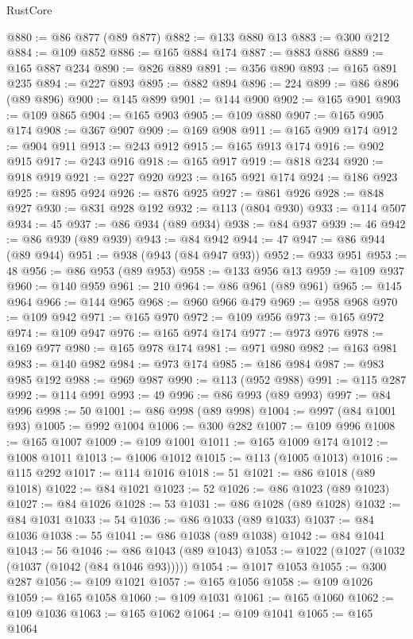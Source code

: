 \begin{lexlean}{RustCore}
\begin{coremodule}
@880 := @86 @877 (@89 @877)
@882 := @133 @880 @13
@883 := @300 @212
@884 := @109 @852
@886 := @165 @884 @174
@887 := @883 @886
@889 := @165 @887 @234
@890 := @826 @889
@891 := @356 @890
@893 := @165 @891 @235
@894 := @227 @893
@895 := @882 @894
@896 := 224
@899 := @86 @896 (@89 @896)
@900 := @145 @899
@901 := @144 @900
@902 := @165 @901
@903 := @109 @865
@904 := @165 @903
@905 := @109 @880
@907 := @165 @905 @174
@908 := @367 @907
@909 := @169 @908
@911 := @165 @909 @174
@912 := @904 @911
@913 := @243 @912
@915 := @165 @913 @174
@916 := @902 @915
@917 := @243 @916
@918 := @165 @917
@919 := @818 @234
@920 := @918 @919
@921 := @227 @920
@923 := @165 @921 @174
@924 := @186 @923
@925 := @895 @924
@926 := @876 @925
@927 := @861 @926
@928 := @848 @927
@930 := @831 @928 @192
@932 := @113 (@804 @930)
@933 := @114 @507
@934 := 45
@937 := @86 @934 (@89 @934)
@938 := @84 @937
@939 := 46
@942 := @86 @939 (@89 @939)
@943 := @84 @942
@944 := 47
@947 := @86 @944 (@89 @944)
@951 := @938 (@943 (@84 @947 @93))
@952 := @933 @951
@953 := 48
@956 := @86 @953 (@89 @953)
@958 := @133 @956 @13
@959 := @109 @937
@960 := @140 @959
@961 := 210
@964 := @86 @961 (@89 @961)
@965 := @145 @964
@966 := @144 @965
@968 := @960 @966 @479
@969 := @958 @968
@970 := @109 @942
@971 := @165 @970
@972 := @109 @956
@973 := @165 @972
@974 := @109 @947
@976 := @165 @974 @174
@977 := @973 @976
@978 := @169 @977
@980 := @165 @978 @174
@981 := @971 @980
@982 := @163 @981
@983 := @140 @982
@984 := @973 @174
@985 := @186 @984
@987 := @983 @985 @192
@988 := @969 @987
@990 := @113 (@952 @988)
@991 := @115 @287
@992 := @114 @991
@993 := 49
@996 := @86 @993 (@89 @993)
@997 := @84 @996
@998 := 50
@1001 := @86 @998 (@89 @998)
@1004 := @997 (@84 @1001 @93)
@1005 := @992 @1004
@1006 := @300 @282
@1007 := @109 @996
@1008 := @165 @1007
@1009 := @109 @1001
@1011 := @165 @1009 @174
@1012 := @1008 @1011
@1013 := @1006 @1012
@1015 := @113 (@1005 @1013)
@1016 := @115 @292
@1017 := @114 @1016
@1018 := 51
@1021 := @86 @1018 (@89 @1018)
@1022 := @84 @1021
@1023 := 52
@1026 := @86 @1023 (@89 @1023)
@1027 := @84 @1026
@1028 := 53
@1031 := @86 @1028 (@89 @1028)
@1032 := @84 @1031
@1033 := 54
@1036 := @86 @1033 (@89 @1033)
@1037 := @84 @1036
@1038 := 55
@1041 := @86 @1038 (@89 @1038)
@1042 := @84 @1041
@1043 := 56
@1046 := @86 @1043 (@89 @1043)
@1053 := @1022 (@1027 (@1032 (@1037 (@1042 (@84 @1046 @93)))))
@1054 := @1017 @1053
@1055 := @300 @287
@1056 := @109 @1021
@1057 := @165 @1056
@1058 := @109 @1026
@1059 := @165 @1058
@1060 := @109 @1031
@1061 := @165 @1060
@1062 := @109 @1036
@1063 := @165 @1062
@1064 := @109 @1041
@1065 := @165 @1064

\end{coremodule}
\end{lexlean}

